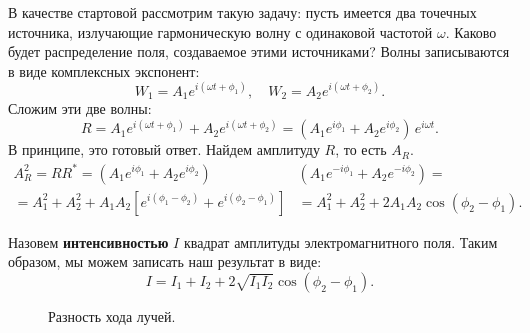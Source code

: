 \documentclass[12pt,a4paper]{article}
\numberwithin{equation}{section}
\numberwithin{equation}{section}
\begin{document}
В качестве стартовой рассмотрим такую задачу: пусть имеется два
точечных источника, излучающие гармоническую волну с одинаковой
частотой $\omega$. Каково будет распределение поля, создаваемое этими
источниками?  Волны записываются в виде комплексных экспонент:
\begin{equation}
W_1=A_1 e^{i(\omega t + \phi_1)}, \quad W_2 = A_2 e^{i(\omega t + \phi_2)}.
\end{equation}
Сложим эти две волны:
\begin{equation}
R = A_1 e^{i(\omega t + \phi_1)} + A_2 e^{i(\omega t + \phi_2)} = (A_1 e^{i \phi_1} + A_2 e^{i \phi_2} )\, e^{i \omega t}.
\end{equation}
В принципе, это готовый ответ. Найдем амплитуду $R$, то есть $A_R$. 
\begin{equation}
\begin{split}
A_R^2 = R R^{*} = (A_1 e^{i \phi_1} + A_2 e^{i \phi_2} ) & (A_1 e^{-i \phi_1} + A_2 e^{-i \phi_2} ) =\\
=A_1^2 + A_2^2 + A_1 A_2 \left[ e^{i (\phi_1 - \phi_2)} + e^{i (\phi_2 - \phi_1)} \right] &= A_1^2 + A_2^2 + 2 A_1 A_2 \cos (\phi_2 - \phi_1).
\end{split}
\end{equation}

Назовем \textbf{интенсивностью} $I$ квадрат амплитуды электромагнитного поля. Таким образом, мы можем записать наш результат в виде:
\begin{equation} \label{eq:sum_waves}
I = I_1 + I_2 + 2\sqrt{I_1 I_2} \cos (\phi_2 - \phi_1).
\end{equation}

\begin{figure}[h]
  \centering
  \caption{Разность хода лучей.}
  \label{fig:two_paths}
\end{figure}
\end{document}

